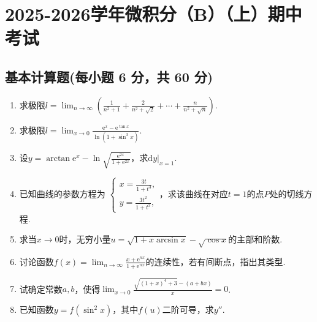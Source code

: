 \documentclass[../main.tex]{subfiles}
\begin{document}
\chapter{2025-2026学年微积分（B）（上）期中考试}

\section{基本计算题(每小题 6 分，共 60 分)}
\begin{enumerate}
    \item 求极限$l=\lim_{n\to\infty}\left(\frac{1}{n^{2}+1}+\frac{2}{n^{2}+\sqrt{2}}
              +\cdots+\frac{n}{n^{2}+\sqrt{n}}\right).$
          \vspace{10em}

    \item 求极限$l=\lim_{x\to0}\frac{\mathrm{e}^{x}-\mathrm{e}^{\tan x}}{\ln(1+\sin^{3}
                  x)}.$
          \vspace{10em}

    \item 设$y=\arctan \mathrm{e}^{x}-\ln\sqrt{\frac{\mathrm{e}^{2x}}{1+\mathrm{e}^{2x}}}$，求$\mathrm{d}
              y\big |_{x=1}$.
          \vspace{10em}

    \item 已知曲线的参数方程为 $\begin{cases}
                  x=\frac{3t}{1+t^{3}}, \\
                  y=\frac{3t^{2}}{1+t^{3}},
              \end{cases}$，求该曲线在对应$t=1$的点$P$处的切线方程.
          \vspace{10em}

    \item 求当$x\to0$时，无穷小量$u=\sqrt{1+x\arcsin x}-\sqrt{\cos x}$的主部和阶数.
          \vspace{10em}

    \item 讨论函数$f(x)=\lim_{n\to\infty}\frac{x+\mathrm{e}^{nx}}{1+\mathrm{e}^{nx}}$的连续性，若有间断点，指出其类型.
          \vspace{10em}

    \item 试确定常数$a,b$，使得$\lim_{x\to0}\frac{\sqrt{(1+x)^4+3}-(a+bx)}{x}=0$.
          \vspace{10em}

    \item 已知函数$y=f(\sin^{2} x)$，其中$f(u)$二阶可导，求$y''$.
          \vspace{10em}


\end{enumerate}
\end{document}
